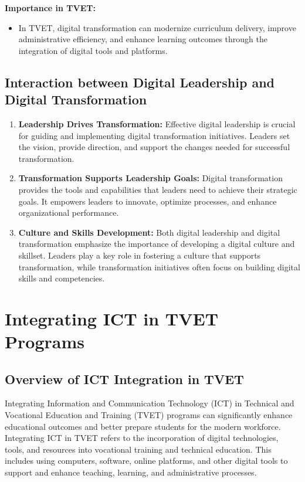 \documentclass[10pt]{article}
\begin{document}
\textbf{Importance in TVET:}
\begin{itemize}
    \item In TVET, digital transformation can modernize curriculum delivery, improve administrative efficiency, and enhance learning outcomes through the integration of digital tools and platforms.
\end{itemize}

\subsection*{Interaction between Digital Leadership and Digital Transformation}

\begin{enumerate}[label=\roman*.]
    \item \textbf{Leadership Drives Transformation:} Effective digital leadership is crucial for guiding and implementing digital transformation initiatives. Leaders set the vision, provide direction, and support the changes needed for successful transformation.
    \item \textbf{Transformation Supports Leadership Goals:} Digital transformation provides the tools and capabilities that leaders need to achieve their strategic goals. It empowers leaders to innovate, optimize processes, and enhance organizational performance.
    \item \textbf{Culture and Skills Development:} Both digital leadership and digital transformation emphasize the importance of developing a digital culture and skillset. Leaders play a key role in fostering a culture that supports transformation, while transformation initiatives often focus on building digital skills and competencies.
\end{enumerate}

\section*{Integrating ICT in TVET Programs}

\subsection*{Overview of ICT Integration in TVET}

Integrating Information and Communication Technology (ICT) in Technical and Vocational Education and Training (TVET) programs can significantly enhance educational outcomes and better prepare students for the modern workforce. Integrating ICT in TVET refers to the incorporation of digital technologies, tools, and resources into vocational training and technical education. This includes using computers, software, online platforms, and other digital tools to support and enhance teaching, learning, and administrative processes.
\end{document}
